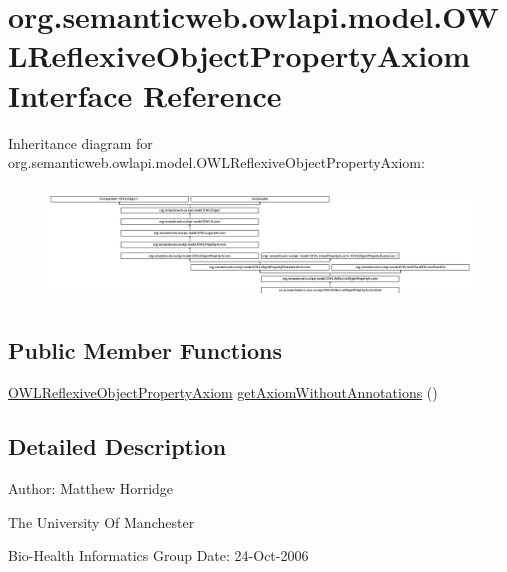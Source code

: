 \hypertarget{interfaceorg_1_1semanticweb_1_1owlapi_1_1model_1_1_o_w_l_reflexive_object_property_axiom}{\section{org.\-semanticweb.\-owlapi.\-model.\-O\-W\-L\-Reflexive\-Object\-Property\-Axiom Interface Reference}
\label{interfaceorg_1_1semanticweb_1_1owlapi_1_1model_1_1_o_w_l_reflexive_object_property_axiom}
}
Inheritance diagram for org.\-semanticweb.\-owlapi.\-model.\-O\-W\-L\-Reflexive\-Object\-Property\-Axiom\-:\begin{figure}[H]
\begin{center}
\leavevmode
\includegraphics[height=3.060109cm]{interfaceorg_1_1semanticweb_1_1owlapi_1_1model_1_1_o_w_l_reflexive_object_property_axiom}
\end{center}
\end{figure}
\subsection*{Public Member Functions}
\begin{DoxyCompactItemize}
\item 
\hyperlink{interfaceorg_1_1semanticweb_1_1owlapi_1_1model_1_1_o_w_l_reflexive_object_property_axiom}{O\-W\-L\-Reflexive\-Object\-Property\-Axiom} \hyperlink{interfaceorg_1_1semanticweb_1_1owlapi_1_1model_1_1_o_w_l_reflexive_object_property_axiom_adc46ea9a00293ddbc37dac756941e1bd}{get\-Axiom\-Without\-Annotations} ()
\end{DoxyCompactItemize}


\subsection{Detailed Description}
Author\-: Matthew Horridge\par
 The University Of Manchester\par
 Bio-\/\-Health Informatics Group Date\-: 24-\/\-Oct-\/2006 

